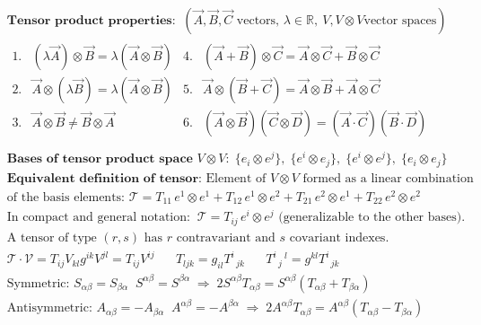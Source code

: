 \begin{align*}
&\textbf{Tensor product properties:} \;\;  (\vec{A}, \vec{B}, \vec{C} \text{ vectors, } \lambda \in \mathbb{R}, \ V, V\otimes V \text{vector spaces})\\
&\begin{array}{rlrl}
\text{1.} & (\lambda \vec{A}) \otimes \vec{B} = \lambda (\vec{A} \otimes \vec{B}) & 
\text{4.} & (\vec{A} + \vec{B}) \otimes \vec{C} = \vec{A} \otimes \vec{C} + \vec{B} \otimes \vec{C} \\
\text{2.} & \vec{A} \otimes (\lambda \vec{B}) = \lambda (\vec{A} \otimes \vec{B}) & 
\text{5.} & \vec{A} \otimes (\vec{B} + \vec{C}) = \vec{A} \otimes \vec{B} + \vec{A} \otimes \vec{C} \\
\text{3.} & \vec{A} \otimes \vec{B} \neq \vec{B} \otimes \vec{A} & 
\text{6.} & (\vec{A} \otimes \vec{B})(\vec{C} \otimes \vec{D}) = (\vec{A} \cdot \vec{C})(\vec{B} \cdot \vec{D}) \\
\end{array}\\
&\textbf{Bases of tensor product space } V \otimes V:\; \{e_i \!\otimes\! e^j\},\;  \{e^i\! \otimes\! e_j\},\;  \{e^i \!\otimes \!e^j\},\; \{e_i \!\otimes \!e_j\} \\
&\textbf{Equivalent definition of tensor:} \text{ Element of } V \otimes V \text{ formed as a linear combination} \\
&\text{of the basis elements: } \mathcal{T} = T_{11}\, e^1 \otimes e^1 + T_{12}\, e^1 \otimes e^2 + T_{21}\, e^2 \otimes e^1 + T_{22}\, e^2 \otimes e^2 \\
&\text{In compact and general notation:} \;\; \mathcal{T} = T_{ij}\, e^i \otimes e^j \text{ (generalizable to the other bases).}\\
&\text{A tensor of type $(r,s)$ has $r$ contravariant and $s$ covariant indexes.}\\
&\mathcal{T}\cdot\mathcal{V} = T_{ij}V_{kl}g^{ik}V^{jl}=T_{ij}V^{ij} \;\; \;\;\;\;  T_{ljk}=g_{il}T^i_{\;\;jk}\;\;\;\;\;\;  T^{i}_{\;\;j} \,^{l} = g^{kl}T^i_{\; \; jk}\\
&\text{Symmetric: } S_{\alpha \beta} = S_{\beta \alpha }\; \; S^{\alpha \beta} = S^{\beta\alpha}\; \Rightarrow \; 2S^{\alpha \beta}T_{\alpha \beta}= S^{\alpha \beta}(T_{\alpha\beta}+ T_{\beta \alpha})\\
&\text{Antisymmetric: } A_{\alpha \beta} = -A_{\beta \alpha }\; \; A^{\alpha \beta} = -A^{\beta\alpha} \; \Rightarrow \; 2A^{\alpha \beta}T_{\alpha \beta}= A^{\alpha \beta}(T_{\alpha\beta}- T_{\beta \alpha})
\end{align*}
